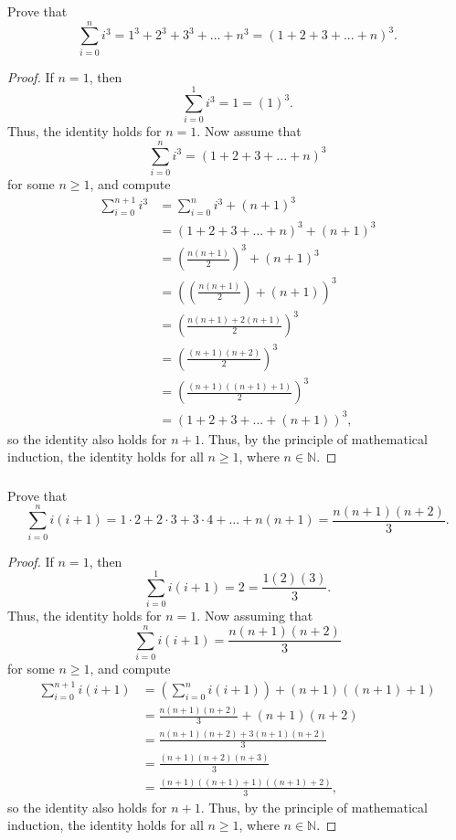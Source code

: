 \documentclass[11pt]{article}
\begin{document}
\subsubsection{}
Prove that
\[
	\sum_{i=0}^{n} i^3 = 1^3 + 2^3 + 3^3 + ... + n^3 = (1+2+3+...+n)^3.
\]
\begin{proof}
	If $n=1$, then
	\[
		\sum_{i=0}^{1} i^3 = 1 = (1)^3.
	\]
	Thus, the identity holds for $n=1$. Now assume that
	\[
		\sum_{i=0}^{n} i^3 = (1+2+3+...+n)^3
	\]
	for some $n \geq 1$, and compute 
	\begin{align*}
		\sum_{i=0}^{n+1} i^3 & = \sum_{i=0}^{n} i^3 + (n+1)^3\\
				     & = (1+2+3+...+n)^3 + (n+1)^3 \\
				     & = \left( \frac{n(n+1)}{2} \right)^3 + (n+1)^3 \\
				     & = \left( \left( \frac{n(n+1)}{2} \right) + (n+1) \right)^3 \\
				     & = \left( \frac{n(n+1)+2(n+1)}{2} \right)^3 \\
				     & = \left( \frac{(n+1)(n+2)}{2} \right)^3 \\
				     & = \left( \frac{(n+1)((n+1)+1)}{2} \right)^3 \\
				     & = (1+2+3+...+(n+1))^3,
	\end{align*}
	so the identity also holds for $n+1$. Thus, by the principle of mathematical induction,
	the identity holds for all $n \geq 1$, where $n \in \mathbb{N}$.
\end{proof}

\newpage

\setcounter{subsubsection}{3}

\subsubsection{}
Prove that
\[
	\sum_{i=0}^{n} i(i+1) = 1\cdot2 + 2\cdot3 + 3\cdot4 + ... + n(n+1) = \frac{n(n+1)(n+2)}{3}.
\]
\begin{proof}
	If $n=1$, then
	\[
		\sum_{i=0}^{1} i(i+1) = 2 = \frac{1(2)(3)}{3}.
	\]
	Thus, the identity holds for $n=1$. Now assuming that
	\[
		\sum_{i=0}^{n} i(i+1) = \frac{n(n+1)(n+2)}{3}
	\]
	for some $n \geq 1$, and compute
	\begin{align*}
		\sum_{i=0}^{n+1} i(i+1) & = \left( \sum_{i=0}^{n} i(i+1) \right) + (n+1)((n+1)+1) \\
				        & = \frac{n(n+1)(n+2)}{3} + (n+1)(n+2) \\
				        & = \frac{n(n+1)(n+2) + 3(n+1)(n+2)}{3} \\
				        & = \frac{(n+1)(n+2)(n+3)}{3} \\
				        & = \frac{(n+1)((n+1)+1)((n+1)+2)}{3},
	\end{align*}
	so the identity also holds for $n+1$. Thus, by the principle of mathematical induction,
	the identity holds for all $n \geq 1$, where $n \in \mathbb{N}$.
\end{proof}
\end{document}
